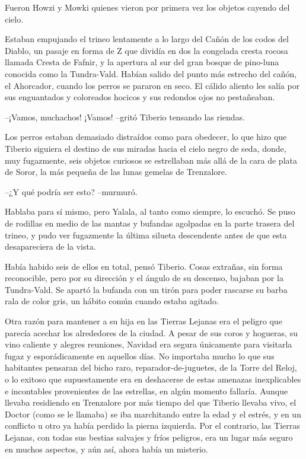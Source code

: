 Fueron Howzi y Mowki quienes vieron por primera vez los objetos cayendo del cielo.
 
Estaban empujando el trineo lentamente a lo largo del Cañón de los codos del Diablo, un pasaje en forma de Z que dividía en dos la congelada cresta rocosa llamada Cresta de Fafnir, y la apertura al sur del gran bosque de pino-luna conocida como la Tundra-Vald. Habían salido del punto más estrecho del cañón, el Ahorcador, cuando los perros se pararon en seco. El cálido aliento les salía por sus enguantados y coloreados hocicos y sus redondos ojos no pestañeaban.
 
--¡Vamos, muchachos! ¡Vamos! --gritó Tiberio tensando las riendas.
 
Los perros estaban demasiado distraídos como para obedecer, lo que hizo que Tiberio siguiera el destino de sus miradas hacia el cielo negro de seda, donde, muy fugazmente, seis objetos curiosos se estrellaban más allá de la cara de plata de Soror, la más pequeña de las lunas gemelas de Trenzalore.
 
--¿Y qué podría ser esto? --murmuró.
 
Hablaba para sí mismo, pero Yalala, al tanto como siempre, lo escuchó. Se puso de rodillas en medio de las mantas y bufandas agolpadas en la parte trasera del trineo, y pudo ver fugazmente la última silueta descendente antes de que esta desapareciera de la vista.
 
Había habido seis de ellos en total, pensó Tiberio. Cosas extrañas, sin forma reconocible, pero por su dirección y el ángulo de su descenso, bajaban por la Tundra-Vald. Se apartó la bufanda con un tirón para poder rascarse su barba rala de color gris, un hábito común cuando estaba agitado.
 
Otra razón para mantener a su hija en las Tierras Lejanas era el peligro que parecía acechar los alrededores de la ciudad. A pesar de sus coros y hogueras, su vino caliente y alegres reuniones, Navidad era segura únicamente para visitarla fugaz y esporádicamente en aquellos días. No importaba mucho lo que sus habitantes pensaran del bicho raro, reparador-de-juguetes, de la Torre del Reloj, o lo exitoso que supuestamente era en deshacerse de estas amenazas inexplicables e incontables provenientes de las estrellas, en algún momento fallaría. Aunque llevaba residiendo en Trenzalore por más tiempo del que Tiberio llevaba vivo, el Doctor (como se le llamaba) se iba marchitando entre la edad y el estrés, y en un conflicto u otro ya había perdido la pierna izquierda. Por el contrario, las Tierras Lejanas, con todas sus bestias salvajes y fríos peligros, era un lugar más seguro en muchos aspectos, y aún así, ahora había un misterio.
 
